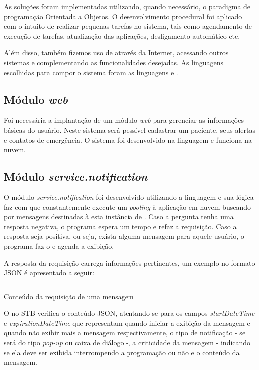 As soluções foram implementadas utilizando, quando necessário, o paradigma
de programação Orientada a Objetos. O desenvolvimento procedural foi aplicado
com o intuito de realizar pequenas tarefas no sistema, tais como agendamento
de execução de tarefas, atualização das aplicações, desligamento automático etc.

Além disso, também fizemos uso de \webservices[] através da Internet, acessando
outros sistemas e complementando as funcionalidades desejadas. As linguagens
escolhidas para compor o sistema foram as linguagens \python[] e \shell.

\subsection{Módulo \textit{web}}

Foi necessária a implantação de um módulo \textit{web} para gerenciar as 
informações básicas do usuário. Neste sistema será possível cadastrar um 
paciente, seus alertas e contatos de emergência. O sistema foi desenvolvido
na linguagem \python[] e funciona na nuvem.

\subsection{Módulo \textit{service.notification}}\label{subsec:notification}

O módulo \textit{service.notification} foi desenvolvido utilizando a linguagem
\python[] e sua lógica faz com que constantemente execute um \textit{pooling} 
à aplicação em nuvem buscando por mensagens destinadas à esta instância de 
\software. Caso a pergunta tenha uma resposta negativa, o programa espera um 
tempo e refaz a requisição. Caso a resposta seja positiva, ou seja, exista 
alguma mensagem para aquele usuário, o programa faz o \download[] e agenda a
exibição. 

A resposta da requisição carrega informações pertinentes, um exemplo no formato
JSON é apresentado a seguir:

\begin{listing}[ht!]
\inputminted{json}{codigos/message.json}
\caption{Conteúdo da requisição de uma mensagem}
\label{lst:notification-json}
\end{listing}

O \software[] no STB verifica o conteúdo JSON, atentando-se para os campos 
\textit{startDateTime} e \textit{expirationDateTime} que representam quando 
iniciar a exibição da mensagem e quando não exibir mais a mensagem 
respectivamente, o tipo de notificação - se será do tipo \textit{pop-up} ou
caixa de diálogo -, a criticidade da mensagem - indicando se ela deve ser
exibida interrompendo a programação ou não e o conteúdo da mensagem. 

